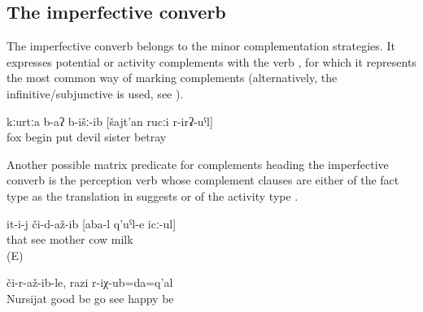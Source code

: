 \subsection{The imperfective converb}
\label{ssec:The imperfective converb}

The imperfective converb belongs to the minor complementation strategies. It expresses potential or activity complements with the verb , for which it represents the most common way of marking complements  (alternatively, the infinitive\slash subjunctive is used, see ).
%
\begin{exe}
	\ex	\label{ex:‎‎‎The fox began betraying / to betray the devil sister}
	\gll	kːurtːa	b-aʔ	b-išː-ib	[šajt'an	rucːi	r-irʡ-uˁl]\\
		fox	begin	put	devil	sister	betray	\\
	\glt	{}
\end{exe}

Another possible matrix predicate for complements heading the imperfective converb is the perception verb  whose complement clauses are either of the fact type as the translation in  suggests or of the activity type . 
%
\begin{exe}

	\ex	\label{ex:‎S/he saw that mother milked the cows}
	\gll	it-i-j	či-d-až-ib	[aba-l	q'uˁl-e	icː-ul]\\
		that	see	mother	cow		milk\\
	\glt	{} (E)
	
	\ex	\label{ex:‎I got happy when I saw that Nursijat recovered and is (already) walking around}
		či-r-až-ib-le,	razi	r-iχ-ub=da=q'al\\
		Nursijat	good	be	go	see	happy	be\\
	\glt	{}

\end{exe}



